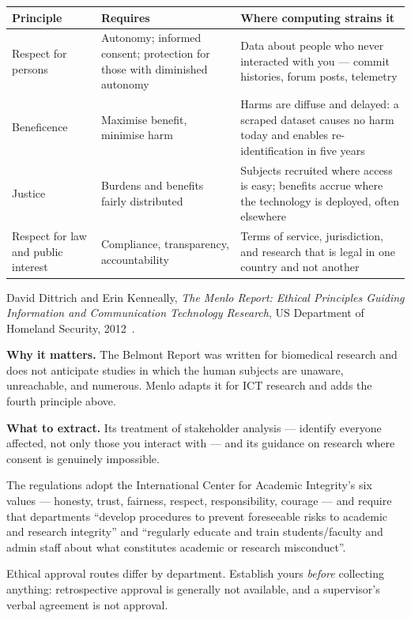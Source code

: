 \begin{center}
\small
\begin{tabular}{@{}L{3.2cm}L{4.4cm}L{6.6cm}@{}}
\toprule
\textbf{Principle} & \textbf{Requires} & \textbf{Where computing strains it} \\
\midrule
Respect for persons
  & Autonomy; informed consent; protection for those with diminished autonomy
  & Data about people who never interacted with you --- commit histories,
    forum posts, telemetry \\
Beneficence
  & Maximise benefit, minimise harm
  & Harms are diffuse and delayed: a scraped dataset causes no harm today and
    enables re-identification in five years \\
Justice
  & Burdens and benefits fairly distributed
  & Subjects recruited where access is easy; benefits accrue where the
    technology is deployed, often elsewhere \\
Respect for law and public interest
  & Compliance, transparency, accountability
  & Terms of service, jurisdiction, and research that is legal in one country
    and not another \\
\bottomrule
\end{tabular}
\end{center}

\begin{paperbox}
David Dittrich and Erin Kenneally, \emph{The Menlo Report: Ethical Principles
Guiding Information and Communication Technology Research}, US Department of
Homeland Security, 2012~\cite{dittrich2012menlo}.\oa{}

\medskip
\textbf{Why it matters.} The Belmont Report was written for biomedical
research and does not anticipate studies in which the human subjects are
unaware, unreachable, and numerous. Menlo adapts it for ICT research and adds
the fourth principle above.

\medskip
\textbf{What to extract.} Its treatment of stakeholder analysis --- identify
everyone affected, not only those you interact with --- and its guidance on
research where consent is genuinely impossible.
\end{paperbox}

\begin{regbox}
The regulations adopt the International Center for Academic Integrity's six
values --- honesty, trust, fairness, respect, responsibility, courage --- and
require that departments ``develop procedures to prevent foreseeable risks to
academic and research integrity'' and ``regularly educate and train
students/faculty and admin staff about what constitutes academic or research
misconduct''.

\medskip
Ethical approval routes differ by department. Establish yours \emph{before}
collecting anything: retrospective approval is generally not available, and a
supervisor's verbal agreement is not approval.
\end{regbox}

